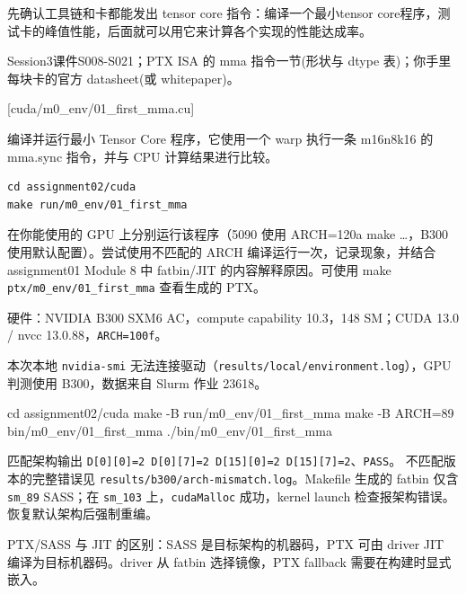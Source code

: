 \documentclass[11pt,a4paper,fontset=fandol]{ctexart}
\newenvironment{Shaded}{}{}
\newcommand{\AttributeTok}[1]{\textcolor[rgb]{0.49,0.56,0.16}{#1}}
\newcommand{\BuiltInTok}[1]{\textcolor[rgb]{0.00,0.50,0.00}{#1}}
\newcommand{\ExtensionTok}[1]{#1}
\newcommand{\FunctionTok}[1]{\textcolor[rgb]{0.02,0.16,0.49}{#1}}
\newcommand{\NormalTok}[1]{#1}
\begin{document}
先确认工具链和卡都能发出 tensor core 指令：编译一个最小tensor
core程序，测试卡的峰值性能，后面就可以用它来计算各个实现的性能达成率。

\begin{reading}

Session3课件S008-S021；PTX ISA 的 mma 指令一节(形状与 dtype 表)；你手里
每块卡的官方 datasheet(或 whitepaper)。

\end{reading}

[cuda/m0\_env/01\_first\_mma.cu]

编译并运行最小 Tensor Core 程序，它使用一个 warp 执行一条 m16n8k16 的
mma.sync 指令，并与 CPU 计算结果进行比较。

\begin{verbatim}
cd assignment02/cuda
make run/m0_env/01_first_mma
\end{verbatim}

在你能使用的 GPU 上分别运行该程序（5090 使用 ARCH=120a make \ldots，B300
使用默认配置）。尝试使用不匹配的 ARCH 编译运行一次，记录现象，并结合
assignment01 Module 8 中 fatbin/JIT 的内容解释原因。可使用 make
\texttt{ptx/\allowbreak{}m0\_\allowbreak{}env/\allowbreak{}01\_\allowbreak{}first\_\allowbreak{}mma}
查看生成的 PTX。

\begin{answer}

硬件：NVIDIA B300 SXM6 AC，compute capability 10.3，148 SM；CUDA 13.0 /
nvcc 13.0.88，\texttt{ARCH=\allowbreak{}100f}。

本次本地 \texttt{nvidia-\allowbreak{}smi}
无法连接驱动（\texttt{results/\allowbreak{}local/\allowbreak{}environment.\allowbreak{}log}），GPU
判测使用 B300，数据来自 Slurm 作业 23618。

\begin{Shaded}
\begin{Highlighting}[]
\BuiltInTok{cd}\NormalTok{ assignment02/cuda}
\FunctionTok{make} \AttributeTok{{-}B}\NormalTok{ run/m0\_env/01\_first\_mma}
\FunctionTok{make} \AttributeTok{{-}B}\NormalTok{ ARCH=89 bin/m0\_env/01\_first\_mma}
\ExtensionTok{./bin/m0\_env/01\_first\_mma}
\end{Highlighting}
\end{Shaded}

匹配架构输出
\texttt{D{[}0{]}{[}0{]}=\allowbreak{}2\ D{[}0{]}{[}7{]}=\allowbreak{}2\ D{[}15{]}{[}0{]}=\allowbreak{}2\ D{[}15{]}{[}7{]}=\allowbreak{}2}、\texttt{PASS}。
不匹配版本的完整错误见
\texttt{results/\allowbreak{}b300/\allowbreak{}arch-\allowbreak{}mismatch.\allowbreak{}log}。Makefile
生成的 fatbin 仅含 \texttt{sm\_\allowbreak{}89} SASS；在
\texttt{sm\_\allowbreak{}103} 上，\texttt{cudaMalloc} 成功，kernel
launch 检查报架构错误。恢复默认架构后强制重编。

PTX/SASS 与 JIT 的区别：SASS 是目标架构的机器码，PTX 可由 driver JIT
编译为目标机器码。driver 从 fatbin 选择镜像，PTX fallback
需要在构建时显式嵌入。

\end{answer}
\end{document}
